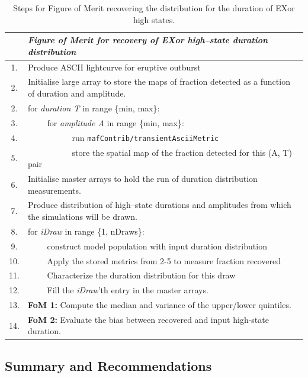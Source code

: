 \begin{table}
\small
\begin{tabular}{c p{12cm}}
& {\it Figure of Merit for recovery of EXor high--state duration distribution}\\
\hline
1.  & Produce ASCII lightcurve for eruptive outburst \\
2.  & Initialise large array to store the maps of fraction detected as a function of duration and amplitude. \\
2.  & for {\it duration T} in range \{min, max\}:  \\
3.  & ~~~~ for {\it amplitude A} in range \{min, max\}: \\
4.  & ~~~~~~~~~~ run {\tt mafContrib/transientAsciiMetric} \\
5.  & ~~~~~~~~~~ store the spatial map of the fraction detected for this (A, T) pair \\
6.  & Initialise master arrays to hold the run of duration distribution measurements.\\
7. & Produce distribution of high--state durations and amplitudes from which the simulations will be drawn. \\
8.  & for {\it iDraw} in range \{1, nDraws\}:\\
9.  & ~~~~ construct model population with input duration distribution \\
10.  & ~~~~ Apply the stored metrics from 2-5 to measure fraction recovered \\
11.  & ~~~~ Characterize the duration distribution for this draw \\
12. & ~~~~ Fill the {\it iDraw}'th entry in the master arrays. \\
13. & {\bf FoM 1:} Compute the median and variance of the upper/lower quintiles. \\
14. & {\bf FoM 2:} Evaluate the bias between recovered and input high-state duration. \\
\hline
\end{tabular}
\caption{Steps for Figure of Merit recovering the distribution
  for the duration of EXor high states.}
\label{table:pseudoForExor}
\end{table}


\subsection{Summary and Recommendations}
\label{sec:\secname:discussion}

